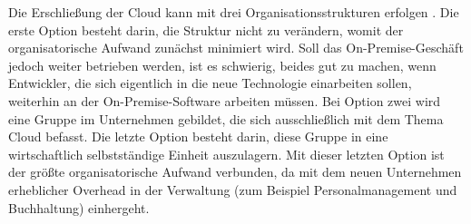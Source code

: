 Die Erschließung der Cloud kann mit drei Organisationsstrukturen erfolgen 
. Die erste Option besteht darin, 
die Struktur nicht zu verändern, womit der organisatorische Aufwand zunächst 
minimiert wird. Soll das On-Premise-Geschäft jedoch weiter betrieben werden, 
ist es schwierig, beides gut zu machen, wenn Entwickler, die sich eigentlich in 
die neue Technologie einarbeiten sollen, weiterhin an der On-Premise-Software 
arbeiten müssen. Bei Option zwei wird eine Gruppe im Unternehmen gebildet, die 
sich ausschließlich mit dem Thema Cloud befasst. Die 
letzte Option besteht darin, diese Gruppe in eine wirtschaftlich selbstständige 
Einheit auszulagern. Mit dieser letzten Option ist der größte organisatorische 
Aufwand verbunden, da mit dem neuen Unternehmen erheblicher Overhead in der 
Verwaltung (zum Beispiel Personalmanagement und Buchhaltung) einhergeht.

